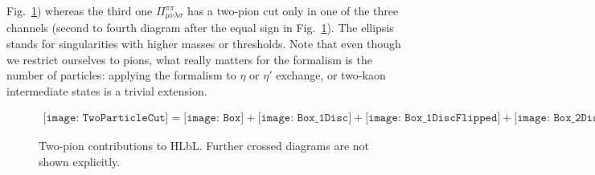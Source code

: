\documentclass[epj]{webofc}
\newcommand{\<}{\langle}
\renewcommand{\>}{\rangle}
\begin{document}
Fig.~\ref{img:HLbLTwoPionContributions}) whereas the third one
$\Pi^{\pi \pi}_{\mu\nu\lambda\sigma}$ has a two-pion cut only in one of the three
channels (second to fourth diagram after the equal sign in
Fig.~\ref{img:HLbLTwoPionContributions}). The ellipsis stands for
singularities with higher masses or thresholds. Note that even though we
restrict ourselves to pions, what really matters for the formalism is the
number of particles: applying the formalism to $\eta$ or $\eta'$ exchange,
or two-kaon intermediate states is a trivial extension. 
\begin{figure}[t]
	\centering
	\begin{align*}
		\texttt{[image: TwoParticleCut]}
		 =
		\texttt{[image: Box]}
		 +
		\texttt{[image: Box\_1Disc]}
		 +
		\texttt{[image: Box\_1DiscFlipped]}
		 +
		\texttt{[image: Box\_2Disc]}
		+ \ldots
	\end{align*}
	\caption{Two-pion contributions to HLbL. Further crossed diagrams are not shown explicitly.}
	\label{img:HLbLTwoPionContributions}
\end{figure}
\end{document}
